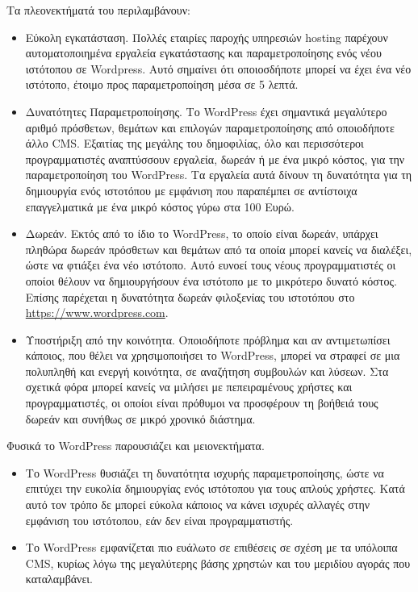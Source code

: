 \documentclass[12pt]{report}
\begin{document}
Τα πλεονεκτήματά του περιλαμβάνουν:
\begin{itemize}
\item Εύκολη εγκατάσταση. Πολλές εταιρίες παροχής υπηρεσιών \textlatin{hosting} παρέχουν αυτοματοποιημένα εργαλεία εγκατάστασης και παραμετροποίησης ενός νέου ιστότοπου σε \textlatin{Wordpress}. Αυτό σημαίνει ότι οποιοσδήποτε μπορεί να έχει ένα νέο ιστότοπο, έτοιμο προς παραμετροποίηση μέσα σε 5 λεπτά.

\item Δυνατότητες Παραμετροποίησης. Το \textlatin{WordPress} έχει σημαντικά μεγαλύτερο αριθμό πρόσθετων, θεμάτων και επιλογών παραμετροποίησης από οποιοδήποτε άλλο \textlatin{CMS}. Εξαιτίας της μεγάλης του δημοφιλίας, όλο και περισσότεροι προγραμματιστές αναπτύσσουν εργαλεία, δωρεάν ή με ένα μικρό κόστος, για την παραμετροποίηση του \textlatin{WordPress}. Τα εργαλεία αυτά δίνουν τη δυνατότητα για τη δημιουργία ενός ιστοτόπου με εμφάνιση που παραπέμπει σε αντίστοιχα επαγγελματικά με ένα μικρό κόστος γύρω στα 100 Ευρώ.

\item Δωρεάν. Εκτός από το ίδιο το \textlatin{WordPress}, το οποίο είναι δωρεάν, υπάρχει πληθώρα δωρεάν πρόσθετων και θεμάτων από τα οποία μπορεί κανείς να διαλέξει, ώστε να φτιάξει ένα νέο ιστότοπο. Αυτό ευνοεί τους νέους προγραμματιστές οι οποίοι θέλουν να δημιουργήσουν ένα ιστότοπο με το μικρότερο δυνατό κόστος. Επίσης παρέχεται η δυνατότητα δωρεάν φιλοξενίας του ιστοτόπου στο \textlatin{\url{https://www.wordpress.com}}.

\item Υποστήριξη από την κοινότητα. Οποιοδήποτε πρόβλημα και αν αντιμετωπίσει κάποιος, που θέλει να χρησιμοποιήσει το \textlatin{WordPress}, μπορεί να στραφεί σε μια πολυπληθή και ενεργή κοινότητα, σε αναζήτηση συμβουλών και λύσεων. Στα σχετικά φόρα μπορεί κανείς να μιλήσει με πεπειραμένους χρήστες και προγραμματιστές, οι οποίοι είναι πρόθυμοι να προσφέρουν τη βοήθειά τους δωρεάν και συνήθως σε μικρό χρονικό διάστημα.
\end{itemize}

Φυσικά το \textlatin{WordPress} παρουσιάζει και μειονεκτήματα.
\begin{itemize}
\item Το \textlatin{WordPress} θυσιάζει τη δυνατότητα ισχυρής παραμετροποίησης, ώστε να επιτύχει την ευκολία δημιουργίας ενός ιστότοπου για τους απλούς χρήστες. Κατά αυτό τον τρόπο δε μπορεί εύκολα κάποιος να κάνει ισχυρές αλλαγές στην εμφάνιση του ιστότοπου, εάν δεν είναι προγραμματιστής.

\item Το \textlatin{WordPress} εμφανίζεται πιο ευάλωτο σε επιθέσεις σε σχέση με τα υπόλοιπα \textlatin{CMS}, κυρίως λόγω της μεγαλύτερης βάσης χρηστών και του μεριδίου αγοράς που καταλαμβάνει.
\end{itemize}
\end{document}
